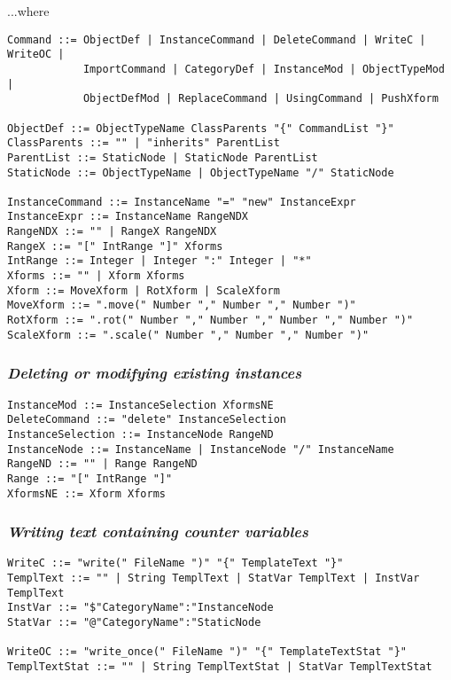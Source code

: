 \documentclass[11pt]{article}
\begin{document}
...where

\begin{verbatim}
Command ::= ObjectDef | InstanceCommand | DeleteCommand | WriteC | WriteOC |
            ImportCommand | CategoryDef | InstanceMod | ObjectTypeMod |
            ObjectDefMod | ReplaceCommand | UsingCommand | PushXform

ObjectDef ::= ObjectTypeName ClassParents "{" CommandList "}" 
ClassParents ::= "" | "inherits" ParentList
ParentList ::= StaticNode | StaticNode ParentList
StaticNode ::= ObjectTypeName | ObjectTypeName "/" StaticNode

InstanceCommand ::= InstanceName "=" "new" InstanceExpr
InstanceExpr ::= InstanceName RangeNDX
RangeNDX ::= "" | RangeX RangeNDX
RangeX ::= "[" IntRange "]" Xforms
IntRange ::= Integer | Integer ":" Integer | "*"
Xforms ::= "" | Xform Xforms
Xform ::= MoveXform | RotXform | ScaleXform
MoveXform ::= ".move(" Number "," Number "," Number ")"
RotXform ::= ".rot(" Number "," Number "," Number "," Number ")"
ScaleXform ::= ".scale(" Number "," Number "," Number ")"
\end{verbatim}


\subsubsection*{\textit{Deleting or modifying existing instances}}

\begin{verbatim}
InstanceMod ::= InstanceSelection XformsNE
DeleteCommand ::= "delete" InstanceSelection
InstanceSelection ::= InstanceNode RangeND
InstanceNode ::= InstanceName | InstanceNode "/" InstanceName
RangeND ::= "" | Range RangeND
Range ::= "[" IntRange "]"
XformsNE ::= Xform Xforms
\end{verbatim}

\subsubsection*{\textit{Writing text containing counter variables}}
\begin{verbatim}
WriteC ::= "write(" FileName ")" "{" TemplateText "}"
TemplText ::= "" | String TemplText | StatVar TemplText | InstVar TemplText
InstVar ::= "$"CategoryName":"InstanceNode
StatVar ::= "@"CategoryName":"StaticNode

WriteOC ::= "write_once(" FileName ")" "{" TemplateTextStat "}"
TemplTextStat ::= "" | String TemplTextStat | StatVar TemplTextStat
\end{verbatim}
\end{document}
